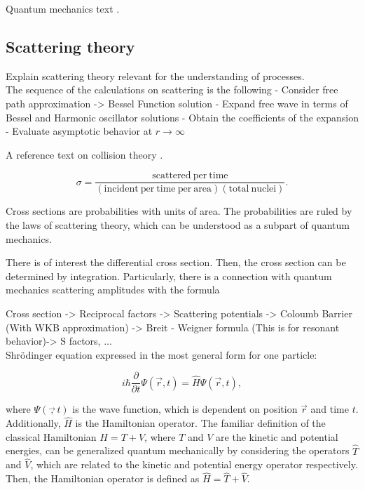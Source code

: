 \documentclass[openany]{book}
\begin{document}
Quantum mechanics text \cite{dick_2016}.

\subsection{Scattering theory} \label{sub:scatteringTheory}


Explain scattering theory relevant for the understanding of  processes. \\

The sequence of the calculations on scattering is the following
-	Consider free path approximation -> Bessel Function solution  
-	Expand free wave in terms of Bessel and Harmonic oscillator solutions
-	Obtain the coefficients of the expansion 
-	Evaluate asymptotic behavior at $r \rightarrow \infty$

A reference text on collision theory \cite{joachain_1983}.

\begin{equation} \label{eq:crossSection_definition}
	\sigma  = \frac{\mathrm{scattered \ per \ time}}{(\mathrm{incident \ per \ time \ per \ area} )(\mathrm{total \ nuclei})}.
\end{equation}

Cross sections are probabilities with units of area. 
The probabilities are ruled by the laws of scattering theory, which can be understood as a subpart of quantum mechanics. 

There is of interest the differential cross section.  Then, the cross section can be determined by integration. Particularly, there is a connection with quantum mechanics scattering amplitudes with the formula


Cross section -> Reciprocal factors -> Scattering potentials -> Coloumb Barrier (With WKB approximation) -> Breit - Weigner formula (This is for resonant behavior)-> S factors, ... \\ 

Shrödinger equation expressed in the most general form for one particle:  

\begin{equation}\label{eq:scattering_Schrodinger_general}
	i \hbar \frac{\partial}{\partial t} \Psi (\vec r, t)= \hat H \Psi (\vec r, t),
\end{equation}

where $\Psi(\vec, t)$ is the wave function, which is dependent on position $\vec r$ and time $t$. Additionally, $\hat H$ is the Hamiltonian operator. The familiar definition of the classical Hamiltonian $H = T + V$, where $T$ and $V$ are the kinetic and potential energies, can be generalized quantum mechanically by considering the operators $\hat T$ and $\hat V$, which are related to the kinetic and potential energy operator respectively. Then, the Hamiltonian operator is defined as $\hat H = \hat T + \hat V$. \\
\end{document}
